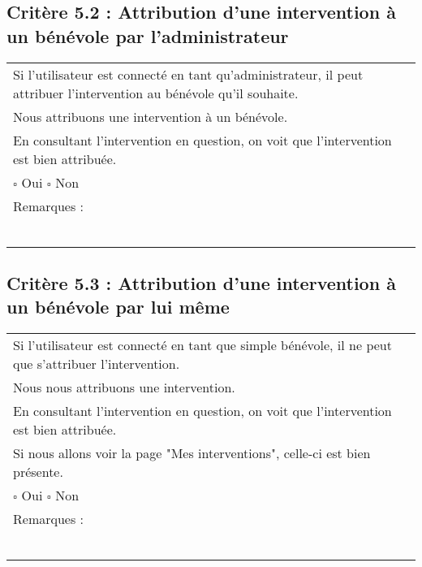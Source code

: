   	\subsection*{Critère 5.2 : Attribution d'une intervention à un bénévole par l'administrateur}
  		\begin{center}
    	 		\begin{tabular}[h]{|p{}|}
			\hline
				Si l'utilisateur est connecté en tant qu'administrateur, il peut attribuer l'intervention au bénévole qu'il souhaite. \\
				Nous attribuons une intervention à un bénévole. \\
				En consultant l'intervention en question, on voit que l'intervention est bien attribuée. \\
				
				$\square$ Oui  \hfill \hfill $\square$ Non \\\hline Remarques : \\ ~\\
			 \\\hline
     		\end{tabular}
  		\end{center}	
  		
  	\subsection*{Critère 5.3 : Attribution d'une intervention à un bénévole par lui même}
  		\begin{center}
    	 		\begin{tabular}[h]{|p{}|}
			\hline
				Si l'utilisateur est connecté en tant que simple bénévole, il ne peut que s'attribuer l'intervention. \\
				Nous nous attribuons une intervention. \\
				En consultant l'intervention en question, on voit que l'intervention est bien attribuée. \\
				Si nous allons voir la page "Mes interventions", celle-ci est bien présente. \\
				
				$\square$ Oui  \hfill \hfill $\square$ Non \\\hline Remarques : \\ ~\\
			 \\\hline
     		\end{tabular}
  		\end{center}	
  		
